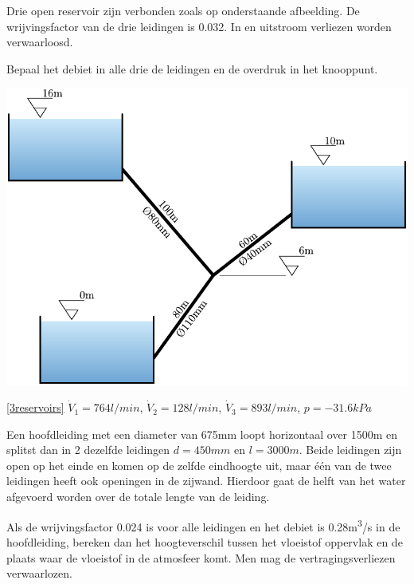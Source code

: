 \begin{toepassing}[*]
	\label{3reservoirs}
Drie open reservoir zijn verbonden zoals op onderstaande afbeelding. De wrijvingsfactor van de drie leidingen is 0.032. In en uitstroom verliezen worden verwaarloosd.
		
Bepaal het debiet in alle drie de leidingen en de overdruk in het knooppunt.
		
	\centering
	\includegraphics{fig/leidingnetwerken/3reservoirs}
\end{toepassing}
\begin{antwoord}{\ref{3reservoirs}}
		$\dot{V}_1 = 764\unit{l/min}$, $\dot{V}_2 = 128\unit{l/min}$, $\dot{V}_3 = 893\unit{l/min}$, $p=-31.6\unit{kPa}$
\end{antwoord}
\begin{toepassing}[*]
	\label{hoogteverschil}
Een hoofdleiding met een diameter van 675mm loopt horizontaal over 1500m en splitst dan in 2 dezelfde leidingen $d=450\unit{mm}$ en $l=3000\unit{m}$. Beide leidingen zijn open op het einde en komen op de zelfde eindhoogte uit, maar één van de twee leidingen heeft ook openingen in de zijwand. Hierdoor gaat de helft van het water afgevoerd worden over de totale lengte van de leiding.

Als de wrijvingsfactor 0.024 is voor alle leidingen en het debiet is 0.28\unit{m^3/s} in de hoofdleiding, bereken dan het hoogteverschil tussen het vloeistof oppervlak en de plaats waar de vloeistof in de atmosfeer komt. Men mag de vertragingsverliezen verwaarlozen.
\end{toepassing}
